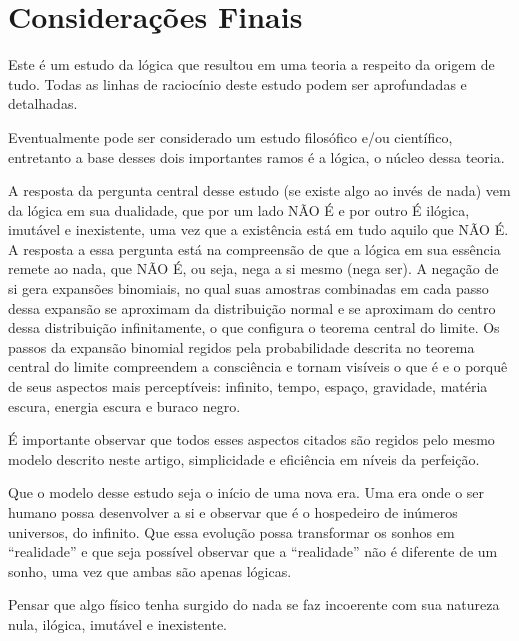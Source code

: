 \section*{Considerações Finais}
Este é um estudo da lógica que resultou em uma teoria a respeito da origem de tudo. Todas as linhas de raciocínio deste estudo podem ser aprofundadas e detalhadas. 

Eventualmente pode ser considerado um estudo filosófico e/ou científico, entretanto a base desses dois importantes ramos é a lógica, o núcleo dessa teoria. 

A resposta da pergunta central desse estudo (se existe algo ao invés de nada) vem da lógica em sua dualidade, que por um lado NÃO É e por outro É ilógica, imutável e inexistente, uma vez que a existência está em tudo aquilo que NÃO É. A resposta a essa pergunta está na compreensão de que a lógica em sua essência remete ao nada, que NÃO É, ou seja, nega a si mesmo (nega ser). A negação de si gera expansões binomiais, no qual suas amostras combinadas em cada passo dessa expansão se aproximam da distribuição normal e se aproximam do centro dessa distribuição infinitamente, o que configura o teorema central do limite. Os passos da expansão binomial regidos pela probabilidade descrita no teorema central do limite compreendem a consciência e tornam visíveis o que é e o porquê de seus aspectos mais perceptíveis: infinito, tempo, espaço, gravidade, matéria escura, energia escura e buraco negro.

É importante observar que todos esses aspectos citados são regidos pelo mesmo modelo descrito neste artigo, simplicidade e eficiência em níveis da perfeição.

Que o modelo desse estudo seja o início de uma nova era. Uma era onde o ser humano possa desenvolver a si e observar que é o hospedeiro de inúmeros universos, do infinito. Que essa evolução possa transformar os sonhos em “realidade” e que seja possível observar que a “realidade” não é diferente de um sonho, uma vez que ambas são apenas lógicas.

Pensar que algo físico tenha surgido do nada se faz incoerente com sua natureza nula, ilógica, imutável e inexistente.